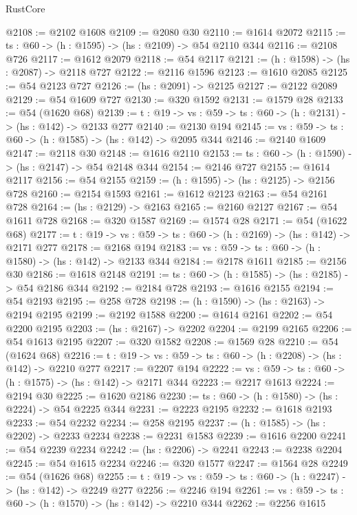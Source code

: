 \begin{lexlean}{RustCore}
\begin{coremodule}
@2108 := @2102 @1608
@2109 := @2080 @30
@2110 := @1614 @2072
@2115 := {ts : @60} -> (h : @1595) -> (hs : @2109) -> @54 @2110 @344
@2116 := @2108 @726
@2117 := @1612 @2079
@2118 := @54 @2117
@2121 := (h : @1598) -> (hs : @2087) -> @2118 @727
@2122 := @2116 @1596
@2123 := @1610 @2085
@2125 := @54 @2123 @727
@2126 := (hs : @2091) -> @2125
@2127 := @2122 @2089
@2129 := @54 @1609 @727
@2130 := @320 @1592
@2131 := @1579 @28
@2133 := @54 (@1620 @68)
@2139 := {t : @19} -> {vs : @59} -> {ts : @60} -> (h : @2131) -> (hs : @142) -> @2133 @277
@2140 := @2130 @194
@2145 := {vs : @59} -> {ts : @60} -> (h : @1585) -> (hs : @142) -> @2095 @344
@2146 := @2140 @1609
@2147 := @2118 @30
@2148 := @1616 @2110
@2153 := {ts : @60} -> (h : @1590) -> (hs : @2147) -> @54 @2148 @344
@2154 := @2146 @727
@2155 := @1614 @2117
@2156 := @54 @2155
@2159 := (h : @1595) -> (hs : @2125) -> @2156 @728
@2160 := @2154 @1593
@2161 := @1612 @2123
@2163 := @54 @2161 @728
@2164 := (hs : @2129) -> @2163
@2165 := @2160 @2127
@2167 := @54 @1611 @728
@2168 := @320 @1587
@2169 := @1574 @28
@2171 := @54 (@1622 @68)
@2177 := {t : @19} -> {vs : @59} -> {ts : @60} -> (h : @2169) -> (hs : @142) -> @2171 @277
@2178 := @2168 @194
@2183 := {vs : @59} -> {ts : @60} -> (h : @1580) -> (hs : @142) -> @2133 @344
@2184 := @2178 @1611
@2185 := @2156 @30
@2186 := @1618 @2148
@2191 := {ts : @60} -> (h : @1585) -> (hs : @2185) -> @54 @2186 @344
@2192 := @2184 @728
@2193 := @1616 @2155
@2194 := @54 @2193
@2195 := @258 @728
@2198 := (h : @1590) -> (hs : @2163) -> @2194 @2195
@2199 := @2192 @1588
@2200 := @1614 @2161
@2202 := @54 @2200 @2195
@2203 := (hs : @2167) -> @2202
@2204 := @2199 @2165
@2206 := @54 @1613 @2195
@2207 := @320 @1582
@2208 := @1569 @28
@2210 := @54 (@1624 @68)
@2216 := {t : @19} -> {vs : @59} -> {ts : @60} -> (h : @2208) -> (hs : @142) -> @2210 @277
@2217 := @2207 @194
@2222 := {vs : @59} -> {ts : @60} -> (h : @1575) -> (hs : @142) -> @2171 @344
@2223 := @2217 @1613
@2224 := @2194 @30
@2225 := @1620 @2186
@2230 := {ts : @60} -> (h : @1580) -> (hs : @2224) -> @54 @2225 @344
@2231 := @2223 @2195
@2232 := @1618 @2193
@2233 := @54 @2232
@2234 := @258 @2195
@2237 := (h : @1585) -> (hs : @2202) -> @2233 @2234
@2238 := @2231 @1583
@2239 := @1616 @2200
@2241 := @54 @2239 @2234
@2242 := (hs : @2206) -> @2241
@2243 := @2238 @2204
@2245 := @54 @1615 @2234
@2246 := @320 @1577
@2247 := @1564 @28
@2249 := @54 (@1626 @68)
@2255 := {t : @19} -> {vs : @59} -> {ts : @60} -> (h : @2247) -> (hs : @142) -> @2249 @277
@2256 := @2246 @194
@2261 := {vs : @59} -> {ts : @60} -> (h : @1570) -> (hs : @142) -> @2210 @344
@2262 := @2256 @1615

\end{coremodule}
\end{lexlean}
